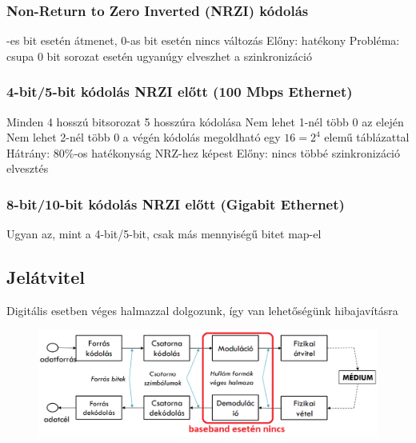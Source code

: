 \documentclass[12pt,a4paper]{article}
\begin{document}
\pagebreak

\subsubsection{Non-Return to Zero Inverted (NRZI) kódolás}

\begin{outline}
	-es bit esetén átmenet, 0-as bit esetén nincs változás
	\1 Előny: hatékony
	\1 Probléma: csupa 0 bit sorozat esetén ugyanúgy elveszhet a szinkronizáció
\end{outline}

\subsubsection{4-bit/5-bit kódolás NRZI előtt (100 Mbps Ethernet)}

\begin{outline}
	\1 Minden 4 hosszú bitsorozat 5 hosszúra kódolása
		\2 Nem lehet 1-nél több 0 az elején
		\2 Nem lehet 2-nél több 0 a végén
		\2 kódolás megoldható egy $16=2^4$ elemű táblázattal
	\1 Hátrány: 80\%-os hatékonyság NRZ-hez képest
	\1 Előny: nincs többé szinkronizáció elvesztés
\end{outline}

\subsubsection{8-bit/10-bit kódolás NRZI előtt (Gigabit Ethernet)}

\begin{outline}
	\1 Ugyan az, mint a 4-bit/5-bit, csak más mennyiségű bitet map-el
\end{outline}

\subsection{Jelátvitel}

\begin{outline}
	\1 Digitális esetben véges halmazzal dolgozunk, így van lehetőségünk hibajavításra
\end{outline}

\begin{figure}[h!]
	\centering
	\includegraphics[width=0.8\linewidth]{baseband-vs-broadband}
\end{figure}
\end{document}
